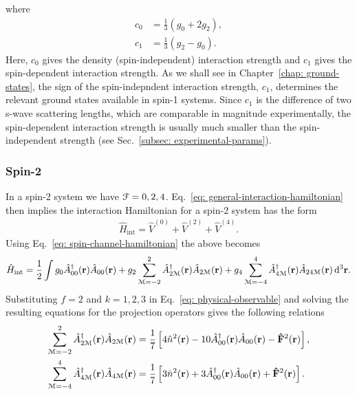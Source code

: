 where
\begin{align}
    c_0 &= \frac{1}{3}\left(g_0 + 2g_2\right), \\
    c_1 &= \frac{1}{3}\left(g_2 - g_0\right).
\end{align}
Here, \(c_0\) gives the density (spin-independent) interaction strength and
\(c_1\) gives the spin-dependent interaction strength.
As we shall see in Chapter~\ref{chap: ground-states}, the sign of the
spin-indepndent interaction strength, \(c_1\), determines the relevant ground
states available in spin-1 systems.
Since \(c_1\) is the difference of two s-wave scattering lengths, which are
comparable in magnitude experimentally, the spin-dependent interaction strength
is usually much smaller than the spin-independent strength (see
Sec.~\ref{subsec: experimental-params}).

\subsubsection{Spin-2}
In a spin-2 system we have \(\EuScript{F}=0,2,4\).
Eq.~\eqref{eq: general-interaction-hamiltonian} then implies the interaction
Hamiltonian for a spin-2 system has the form
\begin{align}
    \hat{H}_\text{int} = \hat{V}^{(0)} + \hat{V}^{(2)} + \hat{V}^{(4)}.
\end{align}
Using Eq.~\eqref{eq: spin-channel-hamiltonian} the above becomes
\begin{align}\label{eq: spin-2-interaction-hamiltonian-projection}
    \hat{H}_\text{int} = \frac{1}{2}\int
        g_0\hat{A}^\dagger_{00}(\vb{r})\hat{A}_{00}(\vb{r})
        + g_2\sum_{\EuScript{M}=-2}^{2}
        \hat{A}^\dagger_{2\EuScript{M}}(\vb{r})\hat{A}_{2\EuScript{M}}(\vb{r})
        + g_4\sum_{\EuScript{M}=-4}^{4}
        \hat{A}^\dagger_{4\EuScript{M}}(\vb{r})\hat{A}_{24\EuScript{M}}(\vb{r})
        \, \dd^3\vb{r}.
\end{align}
Substituting \(f=2\) and \(k=1,2,3\) in Eq.~\eqref{eq: physical-observable}
and solving the resulting equations for the projection operators gives the
following relations
\begin{align}
    \sum_{\EuScript{M}=-2}^{2}
    \hat{A}^\dagger_{2\EuScript{M}}(\vb{r})\hat{A}_{2\EuScript{M}}(\vb{r}) &=
    \frac{1}{7}\left[4\hat{n}^2(\vb{r})
        - 10\hat{A}^\dagger_{00}(\vb{r})\hat{A}_{00}(\vb{r})
        - \vb{\hat{F}}^2(\vb{r})\right], \\
    \sum_{\EuScript{M}=-4}^{4}
    \hat{A}^\dagger_{4\EuScript{M}}(\vb{r})\hat{A}_{4\EuScript{M}}(\vb{r}) &=
    \frac{1}{7}\left[3\hat{n}^2(\vb{r})
        + 3\hat{A}^\dagger_{00}(\vb{r})\hat{A}_{00}(\vb{r})
        + \vb{\hat{F}}^2(\vb{r})\right].
\end{align}
